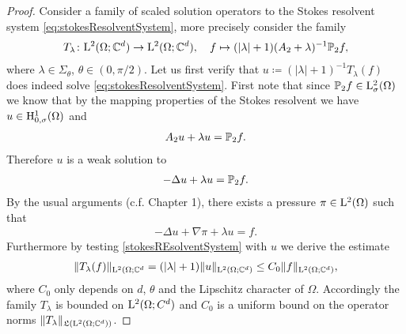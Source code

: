 \begin{proof}
  Consider a family of scaled solution operators to the Stokes resolvent system \eqref{eq:stokesResolventSystem}, more precisely consider the family
  \begin{align*}
    T_\lambda \colon \mathrm{L}^2(\Omega; \mathbb{C}^d) \to \mathrm{L}^2(\Omega; \mathbb{C}^d), \quad f \mapsto (|\lambda| + 1) (A_2 + \lambda)^{-1} \mathbb{P}_2 f,
  \end{align*}
  where $\lambda \in \Sigma_\theta$, $\theta \in (0, \pi/2)$.
  Let us first verify that $u \coloneqq (|\lambda| + 1)^{-1} T_\lambda(f)$ does indeed solve \eqref{eq:stokesResolventSystem}.
  First note that since $\mathbb{P}_2 f \in \mathrm{L}^2_\sigma(\Omega)$ we know that by the mapping properties of the Stokes resolvent we have $u \in \mathrm{H}^1_{0,\sigma}(\Omega)$ and
  \begin{align*}
    A_2 u + \lambda u = \mathbb{P}_2 f.
  \end{align*}
  Therefore $u$ is a weak solution to 
  \begin{align*}
    -\Delta u + \lambda u = \mathbb{P}_2 f.
  \end{align*}
  By the usual arguments (c.f. Chapter 1), there exists a pressure $\pi \in \mathrm{L}^2(\Omega)$ such that 
  \begin{align*}
    -\Delta u + \nabla \pi + \lambda u = f.
  \end{align*}
  Furthermore by testing \eqref{stokesREsolventSystem} with $u$ we derive the estimate
  \begin{align*}
    \| T_\lambda(f) \|_{\mathrm{L}^2(\Omega; \mathbb{C}^d} = (|\lambda| + 1) \|u\|_{\mathrm{L}^2(\Omega; \mathbb{C}^d)}
    \leq C_0 \|f\|_{\mathrm{L}^2(\Omega; \mathbb{C}^d)},
  \end{align*}
  where $C_0$ only depends on $d$, $\theta$ and the Lipschitz character of $\Omega$.
  Accordingly the family $T_\lambda$ is bounded on $\mathrm{L}^2(\Omega; C^d)$ and $C_0$ is a uniform bound on the operator norms $\|T_\lambda\|_{\mathfrak{L}(\mathrm{L}^2(\Omega; \mathbb{C}^d))}$.


\end{proof}
